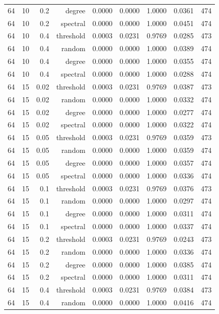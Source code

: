 \begin{table}[t]
\begin{tabular}{lrrrrrrrr}
64 & 10 & 0.2 & degree & 0.0000 & 0.0000 & 1.0000 & 0.0361 & 474 \\
64 & 10 & 0.2 & spectral & 0.0000 & 0.0000 & 1.0000 & 0.0451 & 474 \\
64 & 10 & 0.4 & threshold & 0.0003 & 0.0231 & 0.9769 & 0.0285 & 473 \\
64 & 10 & 0.4 & random & 0.0000 & 0.0000 & 1.0000 & 0.0389 & 474 \\
64 & 10 & 0.4 & degree & 0.0000 & 0.0000 & 1.0000 & 0.0355 & 474 \\
64 & 10 & 0.4 & spectral & 0.0000 & 0.0000 & 1.0000 & 0.0288 & 474 \\
64 & 15 & 0.02 & threshold & 0.0003 & 0.0231 & 0.9769 & 0.0387 & 473 \\
64 & 15 & 0.02 & random & 0.0000 & 0.0000 & 1.0000 & 0.0332 & 474 \\
64 & 15 & 0.02 & degree & 0.0000 & 0.0000 & 1.0000 & 0.0277 & 474 \\
64 & 15 & 0.02 & spectral & 0.0000 & 0.0000 & 1.0000 & 0.0322 & 474 \\
64 & 15 & 0.05 & threshold & 0.0003 & 0.0231 & 0.9769 & 0.0359 & 473 \\
64 & 15 & 0.05 & random & 0.0000 & 0.0000 & 1.0000 & 0.0359 & 474 \\
64 & 15 & 0.05 & degree & 0.0000 & 0.0000 & 1.0000 & 0.0357 & 474 \\
64 & 15 & 0.05 & spectral & 0.0000 & 0.0000 & 1.0000 & 0.0336 & 474 \\
64 & 15 & 0.1 & threshold & 0.0003 & 0.0231 & 0.9769 & 0.0376 & 473 \\
64 & 15 & 0.1 & random & 0.0000 & 0.0000 & 1.0000 & 0.0297 & 474 \\
64 & 15 & 0.1 & degree & 0.0000 & 0.0000 & 1.0000 & 0.0311 & 474 \\
64 & 15 & 0.1 & spectral & 0.0000 & 0.0000 & 1.0000 & 0.0337 & 474 \\
64 & 15 & 0.2 & threshold & 0.0003 & 0.0231 & 0.9769 & 0.0243 & 473 \\
64 & 15 & 0.2 & random & 0.0000 & 0.0000 & 1.0000 & 0.0336 & 474 \\
64 & 15 & 0.2 & degree & 0.0000 & 0.0000 & 1.0000 & 0.0385 & 474 \\
64 & 15 & 0.2 & spectral & 0.0000 & 0.0000 & 1.0000 & 0.0311 & 474 \\
64 & 15 & 0.4 & threshold & 0.0003 & 0.0231 & 0.9769 & 0.0384 & 473 \\
64 & 15 & 0.4 & random & 0.0000 & 0.0000 & 1.0000 & 0.0416 & 474 \\

\end{tabular}
\end{table}
